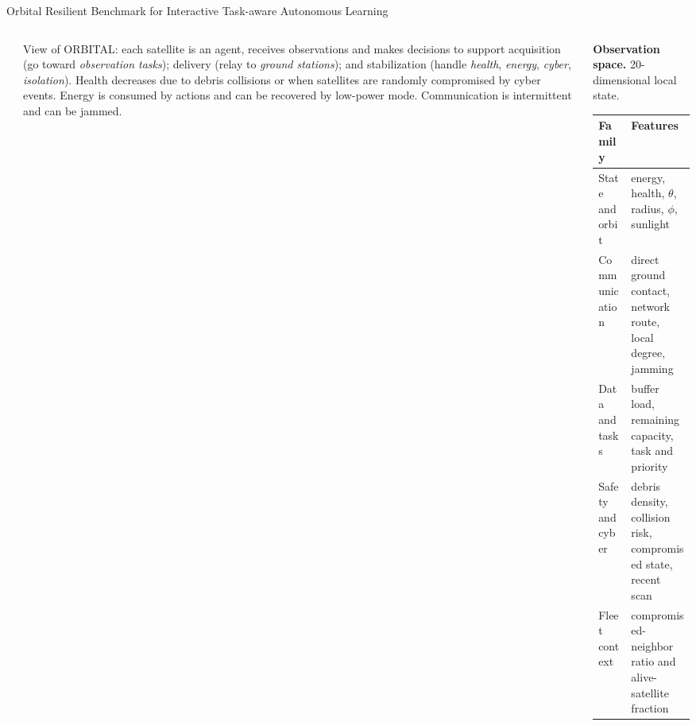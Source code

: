 \documentclass[aspectratio=169]{beamer}
\newcommand{\myCustomSize}[1]{%
  \fontsize{5}{6}\selectfont
  #1
}
\begin{document}
\begin{frame}{Orbital Resilient Benchmark for
    Interactive Task-aware Autonomous Learning}

  \vspace{0.1cm}
  \begin{columns}[c,totalwidth=\textwidth]

    \begin{column}{0.\textwidth}
    \end{column}

    \hspace{-1cm}
    \begin{column}{0.6\textwidth}
      \tiny



      View of ORBITAL: each satellite is an agent, receives observations and makes decisions to support acquisition (go toward \textit{observation tasks}); delivery (relay to \textit{ground stations}); and stabilization (handle \textit{health}, \textit{energy}, \textit{cyber}, \textit{isolation}). Health decreases due to debris collisions or when satellites are randomly compromised by cyber events. Energy is consumed by actions and can be recovered by low-power mode. Communication is intermittent and can be jammed.
    \end{column}

    \begin{column}{0.4\textwidth}
      \myCustomSize
      \textbf{Observation space.} 20-dimensional local state.
      \renewcommand{\arraystretch}{1.2}
      \begin{tabularx}{1.2\linewidth}{p{1.3cm} X}
        \toprule
        Family           & Features                                                       \\
        \midrule
        State and orbit  & energy, health, $\theta$, radius, $\phi$, sunlight             \\
        Communication    & direct ground contact, network route, local degree, jamming    \\
        Data and tasks   & buffer load, remaining capacity, task and priority             \\
        Safety and cyber & debris density, collision risk, compromised state, recent scan \\
        Fleet context    & compromised-neighbor ratio and alive-satellite fraction        \\
        \bottomrule
      \end{tabularx}


\end{column}
\end{columns}
\end{frame}
\end{document}
